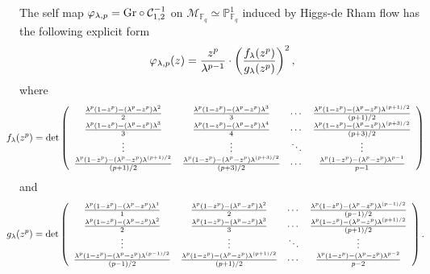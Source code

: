 \documentclass[12pt,twoside]{book}
\theoremstyle{plain}
\theoremstyle{definition}
\theoremstyle{remark}
\numberwithin{equation}{section}
\begin{document}
The self map $\varphi_{\lambda,{p}}=\mathrm{Gr}\circ \mathcal C_{1,2}^{-1}$ on $\mathcal M_{\mathbb{F}_q}\simeq \mathbb P^1_{\mathbb{F}_q}$ induced by Higgs-de Rham flow
has the following explicit form 
\begin{equation*}
\varphi_{\lambda,{p}}(z)=\frac{z^p}{\lambda^{p-1}}\cdot\left( \frac{f_\lambda(z^p)}{g_\lambda(z^p)}\right)^2,
\end{equation*}
where {\tiny
\[ \makebox[-5mm]{} f_\lambda(z^p)=\det\left(\begin{array}{ccccc}  \frac{\lambda^p(1-z^p)-(\lambda^p-z^p)\lambda^{2}}{2}&
\frac{\lambda^p(1-z^p)-(\lambda^p-z^p)\lambda^{3}}{3}  &\cdots&
\frac{\lambda^p(1-z^p)-(\lambda^p-z^p)\lambda^{(p+1)/2}}{(p+1)/2} \\ \frac{\lambda^p(1-z^p)-(\lambda^p-z^p)\lambda^{3}}{3} &
\frac{\lambda^p(1-z^p)-(\lambda^p-z^p)\lambda^{4}}{4} &\cdots&
\frac{\lambda^p(1-z^p)-(\lambda^p-z^p)\lambda^{(p+3)/2}}{(p+3)/2} \\   \vdots&\vdots&\ddots&\vdots\\      \frac{\lambda^p(1-z^p)-(\lambda^p-z^p)\lambda^{(p+1)/2}}{(p+1)/2} &
\frac{\lambda^p(1-z^p)-(\lambda^p-z^p)\lambda^{(p+3)/2}}{(p+3)/2} &\cdots&
\frac{\lambda^p(1-z^p)-(\lambda^p-z^p)\lambda^{p-1}}{p-1} \\  
\end{array} \right)\] }
and 
{\tiny \[\makebox[-5mm]{} g_\lambda(z^p)=\det\left(\begin{array}{ccccc}  \frac{\lambda^p(1-z^p)-(\lambda^p-z^p)\lambda^1}{1}&
\frac{\lambda^p(1-z^p)-(\lambda^p-z^p)\lambda^{2}}{2}  &\cdots&
\frac{\lambda^p(1-z^p)-(\lambda^p-z^p)\lambda^{(p-1)/2}}{(p-1)/2} \\ \frac{\lambda^p(1-z^p)-(\lambda^p-z^p)\lambda^{2}}{2} &
\frac{\lambda^p(1-z^p)-(\lambda^p-z^p)\lambda^{3}}{3} &\cdots&
\frac{\lambda^p(1-z^p)-(\lambda^p-z^p)\lambda^{(p+1)/2}}{(p+1)/2} \\   \vdots&\vdots&\ddots&\vdots\\      \frac{\lambda^p(1-z^p)-(\lambda^p-z^p)\lambda^{(p-1)/2}}{(p-1)/2} &
\frac{\lambda^p(1-z^p)-(\lambda^p-z^p)\lambda^{(p+1)/2}}{(p+1)/2} &\cdots&
\frac{\lambda^p(1-z^p)-(\lambda^p-z^p)\lambda^{p-2}}{p-2} \\  
\end{array} \right).\]} 
\end{document}
